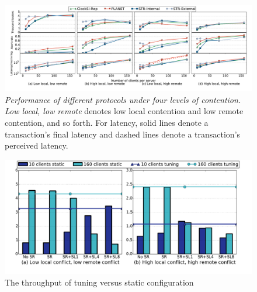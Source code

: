 \begin{figure}
\centering
\def\svgwidth{0.98\columnwidth}
\includegraphics[scale=0.35]{figures/micro}
\vspace{-9mm}
\caption{\small \textit{Performance of different protocols under four levels of contention.} \textit{Low local, low remote} denotes low local contention and low remote contention, and so forth. For latency, solid lines denote a transaction's final latency and dashed lines denote a transaction's perceived latency.}
\label{fig:micro}
\end{figure}


\begin{figure}[t]
\centering
\def\svgwidth{0.98\columnwidth}
\includegraphics[scale = 0.28]{figures/tuning}
\vspace{-9mm}
\caption{\small The throughput of tuning versus static configuration}
\label{fig:tuning}
\end{figure}

